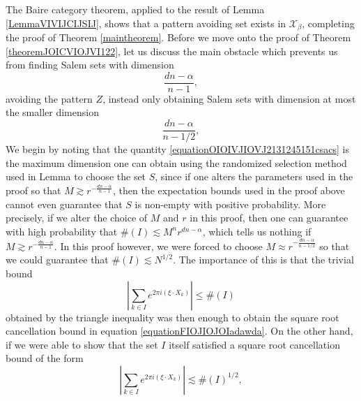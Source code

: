 \documentclass[dvipsnames,letterpaper,12pt]{article}
\numberwithin{equation}{section}
\numberwithin{theorem}{section}
\begin{document}
The Baire category theorem, applied to the result of Lemma \ref{LemmaVIVIJCIJSIJ}, shows that a pattern avoiding set exists in $\mathcal{X}_\beta$, completing the proof of Theorem \ref{maintheorem}. Before we move onto the proof of Theorem \ref{theoremJOICVIOJVI122}, let us discuss the main obstacle which prevents us from finding Salem sets with dimension
%
\begin{equation} \label{equationOIOIVJIOVJ2131245151csacs}
    \frac{dn - \alpha}{n - 1},
\end{equation}
%
avoiding the pattern $Z$, instead only obtaining Salem sets with dimension at most the smaller dimension
%
\begin{equation} \label{equationCIONCIOJIOAJ12312}
    \frac{dn - \alpha}{n-1/2},
\end{equation}
%
We begin by noting that the quantity \eqref{equationOIOIVJIOVJ2131245151csacs} is the maximum dimension one can obtain using the randomized selection method used in Lemma \label{LemmaVIVIJCIJSIJ} to choose the set $S$, since if one alters the parameters used in the proof so that $M \gtrsim r^{-\frac{dn-\alpha}{n-1}}$, then the expectation bounds used in the proof above cannot even guarantee that $S$ is non-empty with positive probability. More precisely, if we alter the choice of $M$ and $r$ in this proof, then one can guarantee with high probability that $\#(I) \lesssim M^n r^{dn - \alpha}$, which tells us nothing if $M \gtrsim r^{-\frac{dn-\alpha}{n-1}}$. In this proof however, we were forced to choose $M \approx r^{-\frac{dn - \alpha}{n - 1/2}}$ so that we could guarantee that $\#(I) \lesssim N^{1/2}$. The importance of this is that the trivial bound
%
\begin{equation}
    \left| \sum_{k \in I} e^{2 \pi i (\xi \cdot X_k)} \right| \leq \#(I)
\end{equation}
%
obtained by the triangle inequality was then enough to obtain the square root cancellation bound in equation \eqref{equationFIOJIOJOIadawda}. On the other hand, if we were able to show that the set $I$ itself satisfied a square root cancellation bound of the form
%
\begin{equation} \label{equationDOIJCVOIVJOI213123}
    \left| \sum_{k \in I} e^{2 \pi i (\xi \cdot X_k)} \right| \lesssim \#(I)^{1/2},
\end{equation}
%
\end{document}
